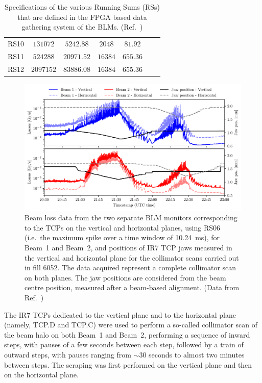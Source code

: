 \begin{table}[hpt]
{\begin{tabular}{c|c|c|c|c|c|c}
        RS10 & $131072$ & $5242.88$ & $2048$ & $81.92$ & & \\
        RS11 & $524288$ & $20971.52$ & $16384$ & $655.36$ & & \\
        RS12 & $2097152$ & $83886.08$ & $16384$ & $655.36$ & & \\
    \bottomrule
    \end{tabular}
    }
    \caption{Specifications of the various Running Sums (RSs) that are defined in the FPGA based data gathering system of the BLMs. (Ref.~\cite{rsdeftable})}
    \label{tab:rs_scheme}
\end{table}

\begin{figure}[hpt]
    \centering
    \includegraphics[width=\textwidth]{5_Diffusion_measurement_LHC/figs/raw.pdf}
    \caption{Beam loss data from the two separate BLM monitors corresponding to the TCPs on the vertical and horizontal planes, using RS06 (i.e.\ the maximum spike over a time window of \SI{10.24}{ms}), for Beam~1 and Beam~2, and positions of IR7 TCP jaws measured in the vertical and horizontal plane for the collimator scans carried out in fill 6052. The data acquired represent a complete collimator scan on both planes. The jaw positions are considered from the beam centre position, measured after a beam-based alignment. (Data from Ref.~\cite{PhysRevAccelBeams.23.044802})}
    \label{fig:raw_data}
\end{figure}

The IR7 TCPs dedicated to the vertical plane and to the horizontal plane (namely, TCP.D and TCP.C) were used to perform a so-called collimator scan of the beam halo on both Beam~1 and Beam~2, performing a sequence of inward steps, with pauses of a few seconds between each step, followed by a train of outward steps, with pauses ranging from $\sim30$ seconds to almost two minutes between steps. The scraping was first performed on the vertical plane and then on the horizontal plane. 

